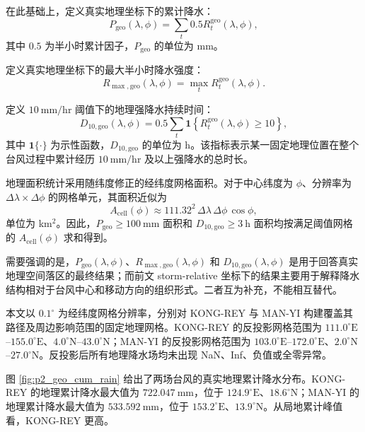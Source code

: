 \documentclass[UTF8,a4paper,zihao=5]{ctexart}
\numberwithin{equation}{section}
\numberwithin{figure}{section}
\numberwithin{table}{section}
\begin{document}
在此基础上，定义真实地理坐标下的累计降水：
\begin{equation}
P_{\mathrm{geo}}(\lambda,\phi)
=
\sum_t 0.5 R_t^{\mathrm{geo}}(\lambda,\phi),
\end{equation}
其中 $0.5$ 为半小时累计因子，$P_{\mathrm{geo}}$ 的单位为 mm。

定义真实地理坐标下的最大半小时降水强度：
\begin{equation}
R_{\max,\mathrm{geo}}(\lambda,\phi)
=
\max_t R_t^{\mathrm{geo}}(\lambda,\phi).
\end{equation}

定义 $10\ \mathrm{mm/hr}$ 阈值下的地理强降水持续时间：
\begin{equation}
D_{10,\mathrm{geo}}(\lambda,\phi)
=
0.5\sum_t
\mathbf{1}
\left\{
R_t^{\mathrm{geo}}(\lambda,\phi)\ge 10
\right\},
\end{equation}
其中 $\mathbf{1}\{\cdot\}$ 为示性函数，$D_{10,\mathrm{geo}}$ 的单位为 h。该指标表示某一固定地理位置在整个台风过程中累计经历 $10\ \mathrm{mm/hr}$ 及以上强降水的总时长。

地理面积统计采用随纬度修正的经纬度网格面积。对于中心纬度为 $\phi$、分辨率为 $\Delta\lambda\times\Delta\phi$ 的网格单元，其面积近似为
\begin{equation}
A_{\mathrm{cell}}(\phi)
\approx
111.32^2\,\Delta\lambda\,\Delta\phi\,\cos\phi,
\end{equation}
单位为 km$^2$。因此，$P_{\mathrm{geo}}\ge100\ \mathrm{mm}$ 面积和 $D_{10,\mathrm{geo}}\ge3\ \mathrm{h}$ 面积均按满足阈值网格的 $A_{\mathrm{cell}}(\phi)$ 求和得到。

需要强调的是，$P_{\mathrm{geo}}(\lambda,\phi)$、$R_{\max,\mathrm{geo}}(\lambda,\phi)$ 和 $D_{10,\mathrm{geo}}(\lambda,\phi)$ 是用于回答真实地理空间落区的最终结果；而前文 storm-relative 坐标下的结果主要用于解释降水结构相对于台风中心和移动方向的组织形式。二者互为补充，不能相互替代。

本文以 $0.1^\circ$ 为经纬度网格分辨率，分别对 KONG-REY 与 MAN-YI 构建覆盖其路径及周边影响范围的固定地理网格。KONG-REY 的反投影网格范围为 $111.0^\circ\mathrm{E}$--$155.0^\circ\mathrm{E}$、$4.0^\circ\mathrm{N}$--$43.0^\circ\mathrm{N}$；MAN-YI 的反投影网格范围为 $103.0^\circ\mathrm{E}$--$172.0^\circ\mathrm{E}$、$2.0^\circ\mathrm{N}$--$27.0^\circ\mathrm{N}$。反投影后所有地理降水场均未出现 NaN、Inf、负值或全零异常。

图 \ref{fig:p2_geo_cum_rain} 给出了两场台风的真实地理累计降水分布。KONG-REY 的地理累计降水最大值为 $722.047\ \mathrm{mm}$，位于 $124.9^\circ\mathrm{E}$、$18.6^\circ\mathrm{N}$；MAN-YI 的地理累计降水最大值为 $533.592\ \mathrm{mm}$，位于 $153.2^\circ\mathrm{E}$、$13.9^\circ\mathrm{N}$。从局地累计峰值看，KONG-REY 更高。
\end{document}
